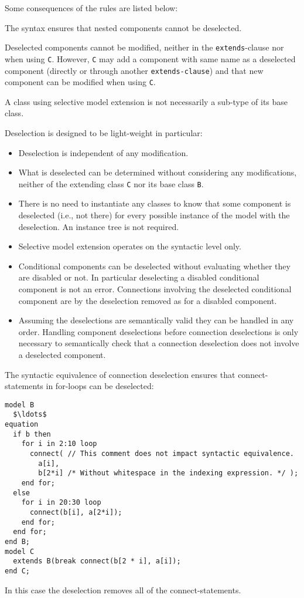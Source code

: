 \begin{nonnormative}
Some consequences of the rules are listed below:

The syntax ensures that nested components cannot be deselected.

Deselected components cannot be modified, neither in the \lstinline!extends!-clause nor when using \lstinline!C!.
However, \lstinline!C! may add a component with same name as a deselected component (directly or through another \lstinline!extends-clause!) and that new component can be modified when using \lstinline!C!.

A class using selective model extension is not necessarily a sub-type of its base class.

Deselection is designed to be light-weight in particular:
\begin{itemize}
\item Deselection is independent of any modification.
\item What is deselected can be determined without considering any modifications, neither of the extending class \lstinline!C! nor its base class \lstinline!B!.
\item There is no need to instantiate any classes to know that some component is deselected (i.e., not there) for every possible instance of the model with the deselection.
An instance tree is not required.
\item Selective model extension operates on the syntactic level only.
\item Conditional components can be deselected without evaluating whether they are disabled or not.
In particular deselecting a disabled conditional component is not an error.
Connections involving the deselected conditional component are by the deselection removed as for a disabled component.
\item Assuming the deselections are semantically valid they can be handled in any order.
Handling component deselections before connection deselections is only necessary to semantically check that a connection deselection does not involve a deselected component.
\end{itemize}

\begin{example}
The syntactic equivalence of connection deselection ensures that connect-statements in for-loops can be deselected:
\begin{lstlisting}[language=modelica]
model B
  $\ldots$
equation
  if b then
    for i in 2:10 loop
      connect( // This comment does not impact syntactic equivalence.
        a[i],
        b[2*i] /* Without whitespace in the indexing expression. */ );
    end for;
  else
    for i in 20:30 loop
      connect(b[i], a[2*i]);
    end for;
  end for;
end B;
model C
  extends B(break connect(b[2 * i], a[i]);
end C;
\end{lstlisting}
In this case the deselection removes all of the connect-statements.
\end{example}
\end{nonnormative}


